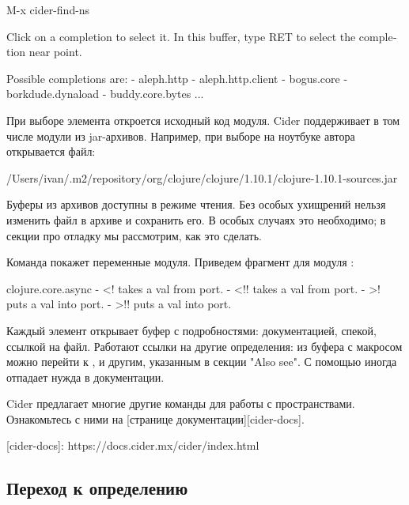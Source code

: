 \begin{english}
  \begin{text}
M-x cider-find-ns

Click on a completion to select it.
In this buffer, type RET to select the completion near point.

Possible completions are:
- aleph.http
- aleph.http.client
- bogus.core
- borkdude.dynaload
- buddy.core.bytes
...
  \end{text}
\end{english}

При выборе элемента откроется исходный код модуля. Cider поддерживает в том числе модули из jar-архивов. Например, при выборе  на ноутбуке автора открывается файл:

\begin{english}
  \begin{text}
/Users/ivan/.m2/repository/org/clojure/clojure/1.10.1/clojure-1.10.1-sources.jar
  \end{text}
\end{english}

Буферы из архивов доступны в режиме чтения. Без особых ухищрений нельзя изменить файл в архиве и сохранить его. В особых случаях это необходимо; в секции про отладку мы рассмотрим, как это сделать.

Команда  покажет переменные модуля. Приведем фрагмент для модуля :

\begin{english}
  \begin{clojure}
clojure.core.async
- <! takes a val from port.
- <!! takes a val from port.
- >! puts a val into port.
- >!! puts a val into port.
  \end{clojure}
\end{english}

Каждый элемент открывает буфер с подробностями: документацией, спекой, ссылкой на файл. Работают ссылки на другие определения: из буфера с макросом \code{>!!} можно перейти к \code{>!},  и другим, указанным в секции "Also see". С помощью  иногда отпадает нужда в документации.

Cider предлагает многие другие команды для работы с пространствами. Ознакомьтесь с ними на [странице документации][cider-docs].

[cider-docs]: https://docs.cider.mx/cider/index.html

\subsection{Переход к определению}

